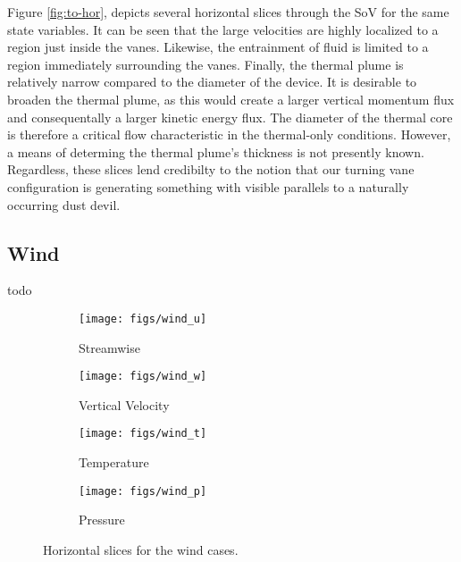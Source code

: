 Figure \ref{fig:to-hor}, depicts several horizontal slices
through the SoV for the same state variables. It can be seen that the
large velocities are highly localized to a region just inside the
vanes. Likewise, the entrainment of fluid is limited to a region
immediately surrounding the vanes. 
%
%
Finally, the thermal plume is relatively
narrow compared to the diameter of the device. It is desirable to
broaden the thermal plume, as this would create a larger vertical
momentum flux and consequentally a larger kinetic energy flux. 
The diameter of the thermal core is
therefore a critical flow characteristic in the thermal-only
conditions. However, a means of determing the thermal plume's thickness 
is not presently known. Regardless, these slices lend credibilty to the
notion that our turning vane configuration is generating something with
visible parallels to a naturally occurring dust devil.   

\subsection{Wind}

todo

%
%
\begin{figure}[htb]

 \begin{subfigure}{.5\textwidth}
  \centering
  \texttt{[image: figs/wind\_u]}
  \caption{Streamwise}
  \label{fig:vt-wind}
 \end{subfigure}%
 \begin{subfigure}{.5\textwidth}
  \centering
  \texttt{[image: figs/wind\_w]}
  \caption{Vertical Velocity}
  \label{fig:vz-wind}
 \end{subfigure}%


 \begin{subfigure}{.5\textwidth}
  \centering
  \texttt{[image: figs/wind\_t]}
  \caption{Temperature}
  \label{fig:t-wind}
 \end{subfigure}%
 \begin{subfigure}{.5\textwidth}
  \centering
  \texttt{[image: figs/wind\_p]}
  \caption{Pressure}
  \label{fig:p-wind}
 \end{subfigure}%

 \caption{Horizontal slices for the wind cases.}
 \label{fig:wind-hor}
\end{figure}


